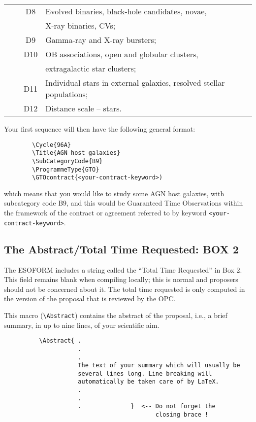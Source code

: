 \documentclass{article}
\begin{document}
\begin{table}[p]
{\begin{center}
\begin{tabular}{llcl}
       &           & D8 & Evolved binaries, black-hole candidates, novae, \\ 
       &           &    &  X-ray binaries, CVs; \\
       &           & D9 & Gamma-ray and X-ray bursters; \\
       &           & D10& OB associations, open and globular clusters, \\
       &           &    &  extragalactic star clusters; \\
       &           & D11& Individual stars in external galaxies, resolved stellar populations;\\
       &           & D12& Distance scale -- stars.\\[4pt]
\hline
\end{tabular}
\end{center}
}
\end{table}

Your first sequence will then have the following general format:
\begin{verbatim}
        \Cycle{96A}
        \Title{AGN host galaxies}
        \SubCategoryCode{B9}
        \ProgrammeType{GTO}
        \GTOcontract{<your-contract-keyword>)
\end{verbatim}
\noindent which means that you would like to study some AGN host
galaxies, with subcategory code B9, and this would be Guaranteed Time
Observations within the framework of the contract or agreement
referred to by keyword \verb|<your-contract-keyword>|.


\subsection{The Abstract/Total Time Requested:  {\bf BOX 2}}

The ESOFORM includes a string called the
``Total Time Requested'' in Box 2. 
This field remains blank when compiling locally; this 
is normal and proposers should not be concerned about it.
The total time requested is only computed in the version of the proposal 
that is reviewed by the OPC. 

This macro (\verb|\Abstract|) contains the  abstract of the  proposal,
i.e., a brief summary, in up to nine lines, of your scientific aim.
\begin{verbatim}
          \Abstract{ .
                     .
                     .
                     The text of your summary which will usually be 
                     several lines long. Line breaking will  
                     automatically be taken care of by LaTeX.
                     .
                     .
                     .              }  <-- Do not forget the
                                           closing brace !
\end{verbatim}
\end{document}
